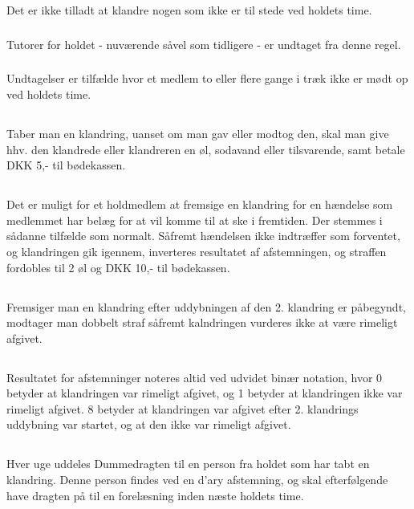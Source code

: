 \documentclass{article}
\begin{document}
\subsection{}
Det er ikke tilladt at klandre nogen som ikke er til stede ved holdets time.
\subsubsection{}
Tutorer for holdet - nuværende såvel som tidligere - er undtaget fra denne regel.
\subsubsection{}
Undtagelser er tilfælde hvor et medlem to eller flere gange i træk ikke er mødt op ved holdets time.
\subsection{}
Taber man en klandring, uanset om man gav eller modtog den, skal man give hhv. den klandrede eller klandreren en øl, sodavand eller tilsvarende, samt betale DKK 5,- til bødekassen.
\subsection{}
Det er muligt for et holdmedlem at fremsige en klandring for en hændelse som medlemmet har belæg for at vil komme til at ske i fremtiden. Der stemmes i sådanne tilfælde som normalt. Såfremt hændelsen ikke indtræffer som forventet, og klandringen gik igennem, inverteres resultatet af afstemningen, og straffen fordobles til 2 øl og DKK 10,- til bødekassen.
\subsection{}
Fremsiger man en klandring efter uddybningen af den 2. klandring er påbegyndt, modtager man dobbelt straf såfremt kalndringen vurderes ikke at være rimeligt afgivet.
\subsection{}
Resultatet for afstemninger noteres altid ved udvidet binær notation, hvor 0 betyder at klandringen var rimeligt afgivet, og 1 betyder at klandringen ikke var rimeligt afgivet. 8 betyder at klandringen var afgivet efter 2. klandrings uddybning var startet, og at den ikke var rimeligt afgivet.
\subsection{}
Hver uge uddeles Dummedragten til en person fra holdet som har tabt en klandring. Denne person findes ved en d'ary afstemning, og skal efterfølgende have dragten på til en forelæsning inden næste holdets time.
\end{document}
